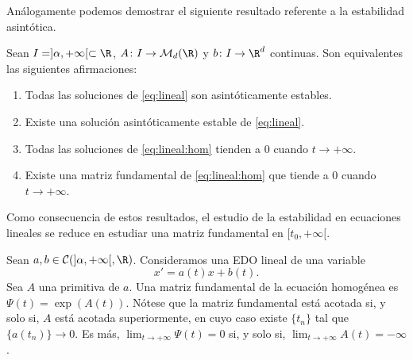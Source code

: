 Análogamente podemos demostrar el siguiente resultado referente a la estabilidad asintótica.
\begin{proposition}
  Sean $I = ]\alpha, +\infty[ \subset \R$, $A \colon I \to \mathcal{M}_{d}(\R)$ y
  $b \colon I \to \R^d$ continuas. Son equivalentes las siguientes afirmaciones:
  \begin{enumerate}
  \item Todas las soluciones de \eqref{eq:lineal} son asintóticamente estables.
  \item Existe una solución asintóticamente estable de \eqref{eq:lineal}.
  \item Todas las soluciones de \eqref{eq:lineal:hom} tienden a $0$ cuando $t \to +\infty$.
  \item Existe una matriz fundamental de \eqref{eq:lineal:hom} que tiende a $0$ cuando
    $t \to +\infty$.
  \end{enumerate}
\end{proposition}

Como consecuencia de estos resultados, el estudio de la estabilidad en ecuaciones lineales se reduce
en estudiar una matriz fundamental en $[t_0, +\infty[$.

\begin{ex}
  Sean $a, b \in \mathcal{C}(]\alpha, +\infty[, \R)$. Consideramos una EDO lineal de una variable
  \begin{equation}
    \label{eq:lineal:1}
    x' = a(t)x+b(t).
  \end{equation}
  Sea $A$ una primitiva de $a$. Una matriz fundamental de la ecuación homogénea es
  $\Psi(t) = \exp(A(t))$. Nótese que la matriz fundamental está acotada si, y solo si, $A$ está
  acotada superiormente, en cuyo caso existe $\{t_n\}$ tal que $\{a(t_n)\} \to 0$. Es más,
  $\lim_{t \to +\infty} \Psi(t) = 0$ si, y solo si, $\lim_{t \to +\infty} A(t) = -\infty$.
\end{ex}

